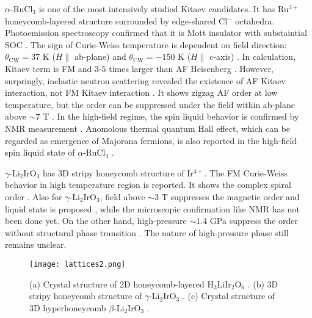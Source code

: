 $\alpha$-RuCl$_3$ is one of the most intensively studied Kitaev candidates.
It has Ru$^{3+}$ honeycomb-layered structure surrounded by edge-shared Cl$^-$ octahedra.
Photoemission spectroscopy confirmed that it is Mott insulator with substaintial SOC \cite{koitzsch2016j}.
The sign of Curie-Weiss temperature is dependent on field direction: $\theta_{\mathrm{CW}} = 37$ K ($H \parallel$ ab-plane) and
$\theta_{\mathrm{CW}} = -150$ K ($H \parallel$ c-axis) \cite{majumder2015anisotropic}.
In calculation, Kitaev term is FM and 3-5 times larger than AF Heisenberg \cite{yadav2016kitaev}.
However, surpringly, inelastic neutron scattering revealed the existence of AF Kitaev interaction, not FM Kitaev interaction \cite{banerjee2017neutron}.
It shows zigzag AF order at low temperature, but the order can be suppressed under the field within ab-plane above $\sim 7$ T \cite{kasahara2018majorana}.
In the high-field regime, the spin liquid behavior is confirmed by NMR measurement \cite{baek2017evidence}.
Anomolous thermal quantum Hall effect, which can be regarded as emergence of Majorana fermions, is also reported in the high-field spin liquid state of $\alpha$-RuCl$_3$
\cite{kasahara2018majorana}.

$\gamma$-Li$_2$IrO$_3$ \cite{modic2014realization} has 3D stripy honeycomb structure of Ir$^{4+}$.
The FM Curie-Weiss behavior in high temperature region is reported.
It shows the complex spiral order \cite{biffin2014noncoplanar}.
Also for $\gamma$-Li$_2$IrO$_3$, field above $\sim 3$ T suppresses the magnetic order and liquid state is proposed \cite{modic2017robust},
while the microscopic confirmation like NMR has not been done yet.
On the other hand, high-pressure $\sim 1.4$ GPa suppress the order without structural phase transition \cite{breznay2017resonant}.
The nature of high-pressure phase still remains unclear.

\begin{figure}
  \centering
  \texttt{[image: lattices2.png]}
  \caption{(a) Crystal structure of 2D honeycomb-layered H$_3$LiIr$_2$O$_6$ \cite{kitagawa2018spin}.
  (b) 3D stripy honeycomb structure of $\gamma$-Li$_2$IrO$_3$ \cite{modic2014realization}.
  (c) Crystal structure of 3D hyperhoneycomb $\beta$-Li$_2$IrO$_3$ \cite{takayama2015hyperhoneycomb}.}
  \label{lattices}
\end{figure}

